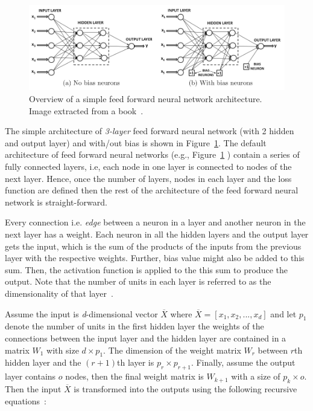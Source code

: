 \begin{figure}[h]
\centering
 \includegraphics[width=\linewidth]{Figures/fig_ffnn.png}
 \caption{Overview of a simple feed forward neural network architecture. Image extracted from a book~\protect\cite{DBLP:books/sp/Aggarwal18}.}
 \label{fig:feed_forward_nn}
\end{figure}

The simple architecture of \textit{3-layer} feed forward neural network (with 2 hidden and output layer) and with/out bias is shown in Figure~\ref{fig:feed_forward_nn}. %
The default architecture of feed forward neural networks (e.g., Figure~\ref{fig:feed_forward_nn} ) contain a series of fully connected layers, i.e, each node in one layer is connected to nodes of the next layer. Hence, once the number of layers, nodes in each layer and the loss function are defined then the rest of the architecture of the feed forward neural network is straight-forward.

Every connection i.e. \textit{edge} between a neuron in a layer and another neuron in the next layer has a weight. Each neuron in all the hidden layers and the output layer gets the input, which is the sum of the products of the inputs from the previous layer with the respective weights. Further, bias value might also be added to this sum. Then, the activation function is applied to the this sum to produce the output. Note that the number of units in each layer is referred to as the dimensionality of that layer~\cite{DBLP:books/sp/Aggarwal18}.

Assume the input is \textit{d}-dimensional vector $\overline{X}$ where $\overline{X}=[x_1,x_2,...,x_d]$ and let $p_1$ denote the number of units in the first hidden layer the weights of the connections between the input layer and the hidden layer are contained in a matrix $W_1$ with size $d\times p_1$. The dimension of the weight matrix $W_r$ between $r$th hidden layer and the $(r+1)$th layer is $p_r\times p_{r+1}$. Finally, assume the output layer contains $o$ nodes, then the final weight matrix is $W_{k+1}$ with a size of $p_k\times o$. Then the input $\overline{X}$ is transformed into the outputs using the following recursive equations~\cite{DBLP:books/sp/Aggarwal18}:

